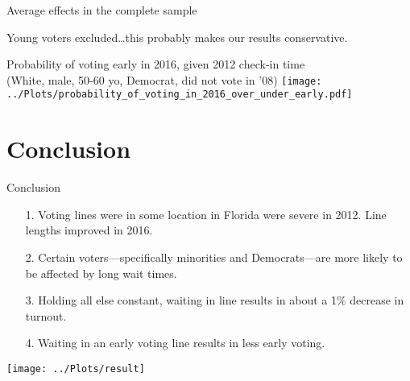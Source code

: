 \documentclass{beamer}
\begin{document}
                      
                      \begin{frame}	
                        Average effects in the complete sample
                        \footnotesize
                      \end{frame}

                      \begin{frame}	
                        Young voters excluded\ldots this probably
                        makes our results conservative.
                      \end{frame}
                      



		\begin{frame}				
                  \centering
			Probability of voting early in 2016, given 2012 check-in time \\
			(White, male, 50-60 yo, Democrat, did not vote in '08)
			\texttt{[image: ../Plots/probability\_of\_voting\_in\_2016\_over\_under\_early.pdf]}
                      \end{frame}




              \section{Conclusion}
	
		\begin{frame}
			Conclusion
			\begin{itemize}
				\item[1.] Voting lines were in some location in Florida were severe in 2012.  Line lengths improved in 2016.
				\item[2.] Certain voters---specifically minorities and Democrats---are more likely to be affected by long wait times. 
				\item[3.] Holding all else constant,
                                  waiting in line results in about a
                                  1\% decrease in turnout.
				\item[4.] Waiting in an early voting line
                                  results in less early voting.
			\end{itemize}
		\end{frame}
		
		\begin{frame}
		\centering
			\texttt{[image: ../Plots/result]}
		\end{frame}
		
			
\end{document}
